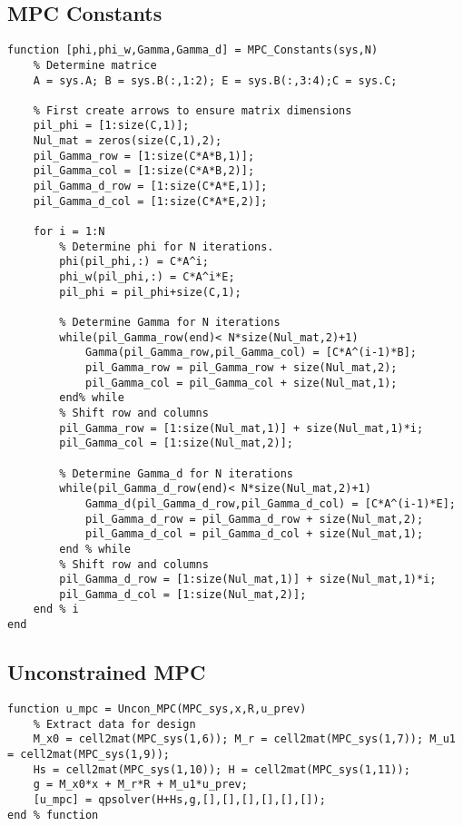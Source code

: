 \begin{bilag}
\begin{appendices}
\subsection{MPC Constants}
\label{app:MPC_Constants}
\begin{lstlisting}[breaklines]
function [phi,phi_w,Gamma,Gamma_d] = MPC_Constants(sys,N)
    % Determine matrice
    A = sys.A; B = sys.B(:,1:2); E = sys.B(:,3:4);C = sys.C;
    
    % First create arrows to ensure matrix dimensions
    pil_phi = [1:size(C,1)];
    Nul_mat = zeros(size(C,1),2);
    pil_Gamma_row = [1:size(C*A*B,1)];
    pil_Gamma_col = [1:size(C*A*B,2)];
    pil_Gamma_d_row = [1:size(C*A*E,1)];
    pil_Gamma_d_col = [1:size(C*A*E,2)];
    
    for i = 1:N
        % Determine phi for N iterations.
        phi(pil_phi,:) = C*A^i;
        phi_w(pil_phi,:) = C*A^i*E;
        pil_phi = pil_phi+size(C,1);

        % Determine Gamma for N iterations
        while(pil_Gamma_row(end)< N*size(Nul_mat,2)+1)
            Gamma(pil_Gamma_row,pil_Gamma_col) = [C*A^(i-1)*B];
            pil_Gamma_row = pil_Gamma_row + size(Nul_mat,2);
            pil_Gamma_col = pil_Gamma_col + size(Nul_mat,1);
        end% while
        % Shift row and columns
        pil_Gamma_row = [1:size(Nul_mat,1)] + size(Nul_mat,1)*i;
        pil_Gamma_col = [1:size(Nul_mat,2)];
        
        % Determine Gamma_d for N iterations
        while(pil_Gamma_d_row(end)< N*size(Nul_mat,2)+1)
            Gamma_d(pil_Gamma_d_row,pil_Gamma_d_col) = [C*A^(i-1)*E];
            pil_Gamma_d_row = pil_Gamma_d_row + size(Nul_mat,2);
            pil_Gamma_d_col = pil_Gamma_d_col + size(Nul_mat,1);
        end % while
        % Shift row and columns
        pil_Gamma_d_row = [1:size(Nul_mat,1)] + size(Nul_mat,1)*i;
        pil_Gamma_d_col = [1:size(Nul_mat,2)];
    end % i
end
\end{lstlisting}
\subsection{Unconstrained MPC}
\label{app:Uncon_MPC}
\begin{lstlisting}[breaklines]
function u_mpc = Uncon_MPC(MPC_sys,x,R,u_prev)
    % Extract data for design
    M_x0 = cell2mat(MPC_sys(1,6)); M_r = cell2mat(MPC_sys(1,7)); M_u1 = cell2mat(MPC_sys(1,9));
    Hs = cell2mat(MPC_sys(1,10)); H = cell2mat(MPC_sys(1,11));
    g = M_x0*x + M_r*R + M_u1*u_prev;
    [u_mpc] = qpsolver(H+Hs,g,[],[],[],[],[],[]);
end % function
\end{lstlisting}



\end{appendices}
\end{bilag}
